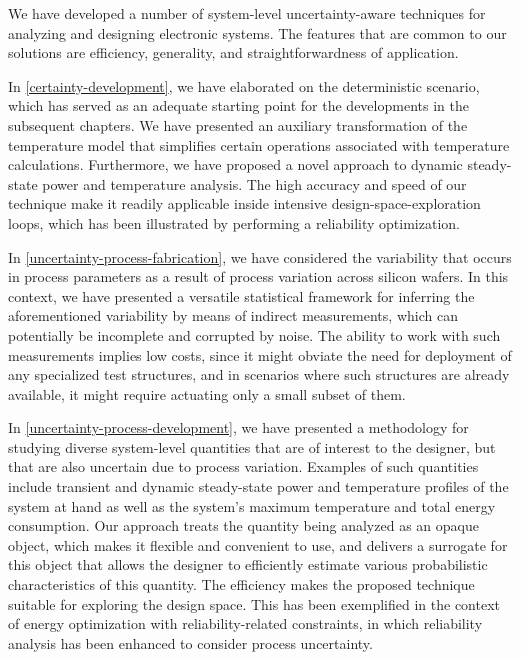 We have developed a number of system-level uncertainty-aware techniques for
analyzing and designing electronic systems. The features that are common to our
solutions are efficiency, generality, and straightforwardness of application.

In \cref{certainty-development}, we have elaborated on the deterministic
scenario, which has served as an adequate starting point for the developments in
the subsequent chapters. We have presented an auxiliary transformation of the
temperature model that simplifies certain operations associated with temperature
calculations. Furthermore, we have proposed a novel approach to dynamic
steady-state power and temperature analysis. The high accuracy and speed of our
technique make it readily applicable inside intensive design-space-exploration
loops, which has been illustrated by performing a reliability optimization.

In \cref{uncertainty-process-fabrication}, we have considered the variability
that occurs in process parameters as a result of process variation across
silicon wafers. In this context, we have presented a versatile statistical
framework for inferring the aforementioned variability by means of indirect
measurements, which can potentially be incomplete and corrupted by noise. The
ability to work with such measurements implies low costs, since it might obviate
the need for deployment of any specialized test structures, and in scenarios
where such structures are already available, it might require actuating only a
small subset of them.

In \cref{uncertainty-process-development}, we have presented a methodology for
studying diverse system-level quantities that are of interest to the designer,
but that are also uncertain due to process variation. Examples of such
quantities include transient and dynamic steady-state power and temperature
profiles of the system at hand as well as the system's maximum temperature and
total energy consumption. Our approach treats the quantity being analyzed as an
opaque object, which makes it flexible and convenient to use, and delivers a
surrogate for this object that allows the designer to efficiently estimate
various probabilistic characteristics of this quantity. The efficiency makes the
proposed technique suitable for exploring the design space. This has been
exemplified in the context of energy optimization with reliability-related
constraints, in which reliability analysis has been enhanced to consider process
uncertainty.

